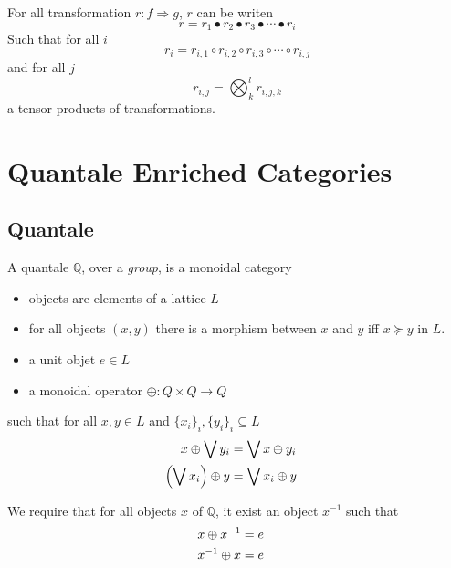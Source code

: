 \documentclass[a4paper]{article}
\begin{document}
\begin{corollary}
For all transformation $r: f \Rightarrow g$, $r$ can be writen
\[
r = r_1 \bullet r_2 \bullet r_3 \bullet \cdots \bullet r_i
\]
Such that for all $i$
\[
r_i = r_{i, 1} \circ r_{i, 2} \circ r_{i, 3} \circ \cdots \circ r_{i, j}
\]
and for all $j$
\[
r_{i, j} = \bigotimes_k^l r_{i, j, k}
\]
a tensor products of transformations.
\end{corollary}

\section{Quantale Enriched Categories}
\label{sec:quant-enrich-categ}



\subsection{Quantale}

A quantale $\mathbb{Q}$, over a \emph{group}, is a monoidal category

\begin{itemize}
\item objects are elements of a lattice $L$
\item for all objects $(x, y)$ there is a morphism between $x$ and $y$ iff $x \succeq y$ in $L$.
\item a unit objet $e \in L$
\item a monoidal operator $\oplus: Q \times Q \to Q$
\end{itemize}

\noindent such that for all $x, y \in L$ and $\{x_i\}_i, \{y_i\}_i \subseteq L$
\begin{align}
x \oplus \bigvee y_i &= \bigvee x \oplus y_i \cr
\left(\bigvee x_i\right) \oplus y &= \bigvee x_i \oplus y
\end{align}

We require that for all objects $x$ of $\mathbb{Q}$, it exist an object $x^{-1}$ such that
\begin{align}
x \oplus x^{-1} &= e \cr
x^{-1} \oplus x &= e
\end{align}

\end{document}
